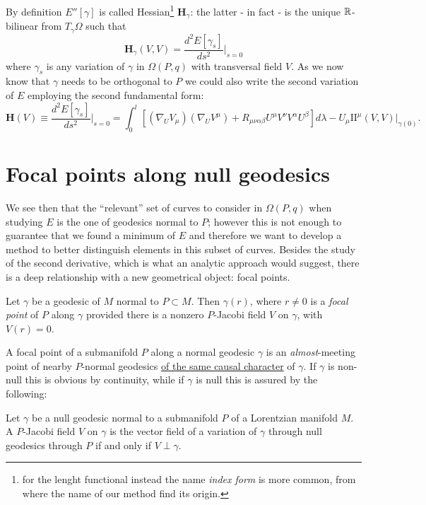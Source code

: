 By definition \(E''[\gamma]\) is called Hessian\footnote{for the lenght functional instead the name \emph{index form} is more common, from where the name of our method find its origin.} \(\textbf{H}_{\gamma}\): the latter - in fact - is the unique \({\mathbb{R}}\)-bilinear from \(T_{\gamma}\Omega\) such that 
\[
\textbf{H}_{\gamma}(V, V) = \frac{d^2E[\gamma_s]}{ds^2}\Big\vert_{s = 0}
\]
where \(\gamma_s\) is any variation of \(\gamma\) in \(\Omega(P, q)\) with transversal field \(V\).
As we now know that \(\gamma\) needs to be orthogonal to \(P\) we could also write the second variation of \(E\) employing the second fundamental form:
{\small
	\begin{equation}
	\label{eq:hessian}
	\textbf{H}(V) \equiv\frac{d^2E[\gamma_s]}{ds^2}\Big\vert_{s = 0} = 
	\int_{0}^{l} \left[(\nabla_UV_{\mu})(\nabla_UV^{\mu}) + R_{\mu\nu\alpha\beta}U^{\mu}V^{\nu}V^{\alpha}U^{\beta}\right] d\lambda - U_{\mu}\mathrm{I\!I}^{\mu}(V, V)\Big\vert_{\gamma(0)}.
\end{equation}}

\section{Focal points along null geodesics}
\label{sec:fp-index-forms}
We see then that the ``relevant'' set of curves to consider in \(\Omega(P, q)\) when studying \(E\) is the one of geodesics normal to \(P\); however this is not enough to guarantee that we found a minimum of \(E\) and therefore we want to develop a method to better distinguish elements in this subset of curves. Besides the study of the second derivative, which is what an analytic approach would suggest, there is a deep relationship with a new geometrical object: focal points.

\vskip 4pt

\begin{definition}
	Let \(\gamma\) be a geodesic of \(M\) normal to \(P \subset M\). Then \(\gamma(r)\), where \(r \neq 0\) is a \emph{focal point} of \(P\) along \(\gamma\) provided there is a nonzero \(P\)-Jacobi field \(V\) on \(\gamma\), with \(V(r) = 0\).
\end{definition}

A focal point of a submanifold \(P\) along a normal geodesic \(\gamma\) is an \emph{almost}-meeting point of nearby \(P\)-normal geodesics \underline{of the same causal character} of \(\gamma\). If \(\gamma\) is non-null this is obvious by continuity, while if \(\gamma\) is null this is assured by the following:
\begin{corollary}
	\label{cor:same-causal-character}
	Let \(\gamma\) be a null geodesic normal to a submanifold \(P\) of a Lorentzian manifold \(M\). A \(P\)-Jacobi field \(V\) on \(\gamma\) is the vector field of a variation of \(\gamma\) through null geodesics through \(P\) if and only if \(V \perp \gamma\).
\end{corollary}

